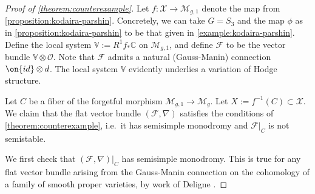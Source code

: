 \subsubsection{}
\label{subsubsection:proof-counterexample}
\begin{proof}[Proof of \autoref{theorem:counterexample}]
Let $f: \mathscr X \to \mathscr{M}_{g,1}$ denote the map from
\autoref{proposition:kodaira-parshin}.
Concretely, we can take $G = S_3$ and the map $\phi$ as in
\autoref{proposition:kodaira-parshin} to be that given in
\autoref{example:kodaira-parshin}.
Define the local system $\mathbb V := R^1 f_* \mathbb C$ on $\mathscr M_{g,1}$,
and define $\mathscr{F}$ to be the vector bundle $\mathbb{V}\otimes
\mathscr{O}$. Note that $\mathscr{F}$ admits a natural (Gauss-Manin) connection $\on{id}\otimes d$. The local system $\mathbb{V}$ evidently underlies a variation of Hodge structure.

 Let $C$ be a
 fiber of the forgetful morphism $\mathscr{M}_{g,1}\to \mathscr{M}_{g}$.
 Let $X := f^{-1}(C) \subset \mathscr X$. We claim that the flat vector bundle $(\mathscr{F}, \nabla)$ satisfies the
conditions of \autoref{theorem:counterexample}, i.e.~it has semisimple monodromy and $\mathscr{F}|_C$ is not semistable.

We first check that $(\mathscr{F}, \nabla)|_C$ has semisimple monodromy. This is
true for any flat vector bundle arising from the Gauss-Manin connection on the
cohomology of a family of smooth proper varieties, by work of Deligne
\cite[Th\'eor\`eme 4.2.6]{deligne:hodge-ii}.


\end{proof}
